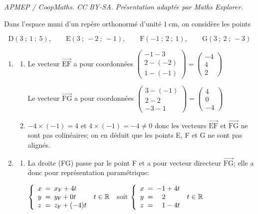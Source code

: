 \documentclass[10pt]{article}
\providecommand{\R}{\mathbb{R}}
\providecommand{\vectt}[1]{\overrightarrow{\mathrm{#1}}}
\begin{document}
\noindent\textit{APMEP / CoopMaths. CC BY-SA. Présentation adaptée par Maths Explorer.}\par\medskip
\medskip

Dans l'espace muni d'un repère orthonormé d'unité $1 \mathrm{~cm}$, on considère les points

\[\mathrm{D}(3~;~1~;~5), \qquad 
\mathrm{E}(3~;~-2~;~-1), \qquad 
\mathrm{F}(-1~;~2~;~1), \qquad 
\mathrm{G}(3~;~2~;~-3)\]



\begin{enumerate}
\item 
	\begin{enumerate}
		\item Le vecteur $\overrightarrow{\text{EF}}$ a pour coordonnées
$\begin{pmatrix}
-1-3 \\ 2-(-2) \\ 1-(-1)
\end{pmatrix}
=
\begin{pmatrix}
-4 \\ 4 \\ 2
\end{pmatrix}$
		
		
 Le vecteur $\overrightarrow{\text{FG}}$ a pour coordonnées
$\begin{pmatrix}
3-(-1) \\ 2-2 \\ -3-1
\end{pmatrix}
=
\begin{pmatrix}
4 \\ 0 \\-4
\end{pmatrix}$

		\item 
$-4\times (-1)=4$ et $4\times (-1)=-4\neq 0$ donc les vecteurs $\vectt{EF}$ et $\vectt{FG}$ ne sont pas colinéaires; on en déduit que les points E, F et G ne sont pas alignés.		
		
		
	\end{enumerate}
\item 
	\begin{enumerate}
		\item 
La droite (FG) passe par le point F et a pour vecteur directeur $\vectt{FG}$; elle a donc pour représentation paramétrique:

$\left \{
\begin{array}{l !{=} l l}
x & x_{\text F} + 4t\\
y & y_{\text F} +0t & t\in\R\\
z & z_{\text F} + (-4)t
\end{array}
\right .	$ soit
$\left \{
\begin{array}{l !{=} l l}
x & -1 + 4t\\
y & \phantom{-}2 & t\in\R\\
z & \phantom{-}1-4t
\end{array}
\right.$


\end{enumerate}
\end{enumerate}
\end{document}
